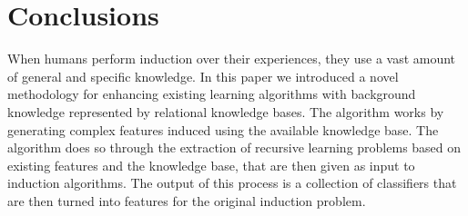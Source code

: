 \documentclass{article}
\theoremstyle{definition}
\begin{document}


\section{Conclusions}

When humans perform induction over their experiences, they use a vast amount of general and specific knowledge. In this paper we introduced a novel methodology for enhancing existing learning algorithms with background knowledge represented by relational knowledge bases.
The algorithm works by generating complex features induced using the available knowledge base. The algorithm does so through the extraction of recursive learning problems based on existing features and the knowledge base, that are then given as input to induction algorithms. The output of this process is a collection of classifiers that are then turned into features for the original induction problem.
\end{document}

